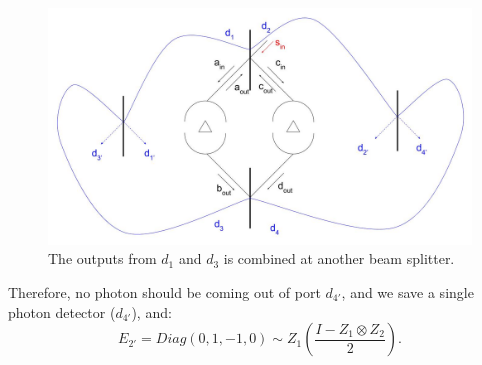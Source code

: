 \documentclass[letterpaper,10pt]{article}
\begin{document}
\begin{figure}[h]
\centering
         \includegraphics[width=5.5in]{DIT_entanglement_3.jpg}
         \caption{The outputs from $d_1$ and $d_3$ is combined at another beam splitter.}
         \label{fig:schematics_3}
\end{figure}

%
Therefore, no photon should be coming out of port $d_{4'}$, and we save a single photon detector ($d_{4'}$), and:
\begin{equation}
	\label{eq:E2'}
	E_{2'} =Diag(0,1,-1,0)\sim Z_1(\frac{I-Z_1\otimes Z_2}{2}).
\end{equation}
\end{document}
